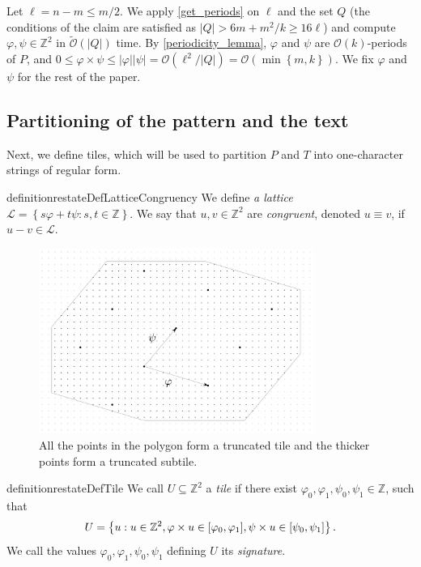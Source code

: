 \documentclass[twoside,leqno]{article}
\let\Cref\cref
\newcommand{\Z}{\mathbb{Z}}
\renewcommand{\O}{\mathcal{O}}
\newcommand{\tO}{\tilde{\mathcal{O}}}
\renewcommand{\L}{\mathcal{L}}
\renewcommand{\phi}{\varphi}
\newcommand{\set}[1]{\left\lbrace #1 \right\rbrace}
\newcommand{\absolute}[1]{\left\lvert#1\right\rvert}
\begin{document}
Let $\ell = n - m \le m / 2$. We apply \Cref{get_periods} on $\ell$ and the set $Q$ (the conditions of the claim are satisfied as $\absolute{Q} > 6m + m^2/k \ge 16\ell$) and compute $\phi, \psi \in \Z^2$ in $\tO(\absolute{Q})$ time. By \Cref{periodicity_lemma}, $\phi$ and $\psi$ are $\O(k)$-periods of $P$, and $0 \le \phi \times \psi \le \absolute{\phi}\absolute{\psi} = \O(\ell^2 / \absolute{Q}) =  \O(\min\set{m, k})$. We fix $\phi$ and $\psi$ for the rest of the paper.

\subsection{Partitioning of the pattern and the text}
Next, we define tiles, which will be used to partition $P$ and $T$ into one-character strings of regular form.

\begin{restatable*}{definition}{restateDefLatticeCongruency}\label{lattice_congruency}
We define \emph{a lattice} $\L = \set{s\phi + t\psi : s, t \in \Z}$. We say that $u, v \in \Z^2$ are \emph{congruent}, denoted $u \equiv v$, if $u - v \in \L$. 
\end{restatable*}

\begin{figure}
	\begin{center}
		\includegraphics[width=0.8\textwidth]{drawings/parquet}
	\end{center}
	\caption{All the points in the polygon form a truncated tile and the thicker points form a truncated subtile.}
	\label{figure:tile}
\end{figure}

\begin{restatable*}[Tile]{definition}{restateDefTile}\label{tile_definition}
We call $U \subseteq \Z^2$ a \emph{tile} if there exist $\phi_0, \phi_1, \psi_0, \psi_1 \in \Z$, such that
	\[ U = \set{u : u \in \Z^2, \h{u} \in [\phi_0, \phi_1], \s{u} \in [\psi_0, \psi_1]}. \]
We call the values $\phi_0, \phi_1, \psi_0, \psi_1$ defining $U$ its \emph{signature}. 
\end{restatable*}
\end{document}
